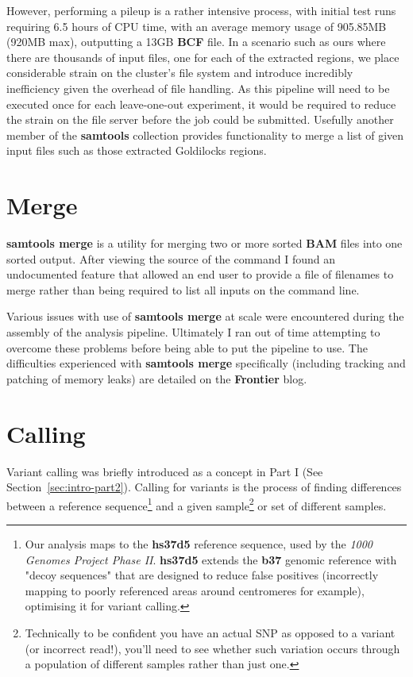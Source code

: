 However, performing a pileup is a rather intensive process, with initial test
runs requiring 6.5 hours of CPU time, with an average memory usage of 905.85MB
(920MB max), outputting a 13GB \textbf{BCF} file. In a scenario such as ours
where there are thousands of input files, one for each of the extracted regions,
we place considerable strain on the cluster's file system and introduce
incredibly inefficiency given the overhead of file handling.  As this pipeline
will need to be executed once for each leave-one-out experiment, it would be
required to reduce the strain on the file server before the job could be
submitted. Usefully another member of the \textbf{samtools} collection provides
functionality to merge a list of given input files such as those extracted
Goldilocks regions.



\section{Merge}

\textbf{samtools merge}\citep{man:samtools} is a utility for merging two or more
sorted \textbf{BAM} files into one sorted output. After viewing the source of
the command I found an undocumented feature that allowed an end user to provide
a file of filenames to merge rather than being required to list all inputs on
the command line.

Various issues with use of \textbf{samtools merge} at scale were encountered
during the assembly of the analysis pipeline. Ultimately I ran out of time
attempting to overcome these problems before being able to put the pipeline to
use. The difficulties experienced with \textbf{samtools merge} specifically
(including tracking and patching of memory leaks) are
detailed on the \textbf{Frontier} blog\citep{frontier}.



\section{Calling}

Variant calling was briefly introduced as a concept in Part I
(See Section~\ref{sec:intro-part2}). Calling for variants is the process
of finding differences between a reference sequence\footnote{Our analysis maps
    to the \textbf{hs37d5} reference sequence, used by the \textit{1000 Genomes
    Project Phase II}\citep{1k-refs}. \textbf{hs37d5} extends the \textbf{b37} genomic
    reference with "decoy sequences" that are designed to reduce false
    positives (incorrectly mapping to poorly referenced areas around centromeres for
    example\citep{biostar:decoy}), optimising it for variant
calling\citep{1k-slides}.} and a given sample\footnote{Technically to be confident
    you have an actual SNP as opposed to a variant (or incorrect read!), you'll
    need to see whether such variation occurs through a population of different
samples rather than just one.} or set of different samples.

